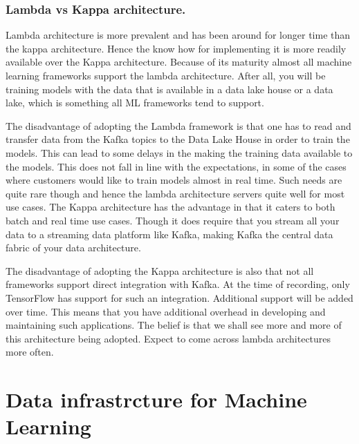 \documentclass[a4paper, 11pt]{book}
\begin{document}
    \subsubsection{Lambda vs Kappa architecture.}
    Lambda architecture is more prevalent and has been around for longer time than the kappa architecture.
    Hence the know how for implementing it is more readily available over the Kappa architecture.
    Because of its maturity almost all machine learning frameworks support the lambda architecture.
    After all, you will be training models with the data that is available in a data lake house or a data lake, which is something all ML frameworks tend to support.

    The disadvantage of adopting the Lambda framework is that one has to read and transfer data from the Kafka topics to the Data Lake House in order to train the models.
    This can lead to some delays in the making the training data available to the models.
    This does not fall in line with the expectations, in some of the cases where customers would like to train models almost in real time.
    Such needs are quite rare though and hence the lambda architecture servers quite well for most use cases.
    The Kappa architecture has the advantage in that it caters to both batch and real time use cases.
    Though it does require that you stream all your data to a streaming data platform like Kafka, making Kafka the central data fabric of your data architecture.

    The disadvantage of adopting the Kappa architecture is also that not all frameworks support direct integration with Kafka.
    At the time of recording, only TensorFlow has support for such an integration.
    Additional support will be added over time.
    This means that you have additional overhead in developing and maintaining such applications.
    The belief is that we shall see more and more of this architecture being adopted.
    Expect to come across lambda architectures more often.



    \section{Data infrastrcture for Machine Learning}
\end{document}
